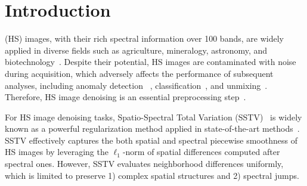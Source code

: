 \section{Introduction}
 (HS) images, with their rich spectral information over 100 bands, are widely applied in diverse fields such as agriculture, mineralogy, astronomy, and biotechnology~\cite{Borengasser2007HSIApplications,Grahn2007Techniques, Thenkabail2016VegetationOverview,Lu2020AgricultureOverview}. Despite their potential, HS images are contaminated with noise during acquisition, which adversely affects the performance of subsequent analyses, including anomaly detection ~\cite{Matteoli2014Anomaly, Su2022Anomaly}, classification~\cite{Ghamisi2017Classification}, and unmixing~\cite{Bioucas-Dias2012UnmixingOverview, Ma2014UnmixingOverview}. Therefore, HS image denoising is an essential preprocessing step~\cite{Shen2015DenoisingOverview, Rasti2018DenoisingOverview, Shen2022DenoisingOverview, Naganuma2022Destriping}.


For HS image denoising tasks, Spatio-Spectral Total Variation (SSTV)~\cite{Aggarwal2016SSTV} is widely known as a powerful regularization method applied in state-of-the-art methods~\cite{Fan2018SSTV-LRTF, Wang2018LRTDTV, Ince2019GLSSTV, Takeyama2020HSSTV, Wang2021l0l1HTV, Takemoto2022GSSTV, Takemoto2023S3TTV, takemoto2024spatiospectral}. SSTV effectively captures the both spatial and spectral piecewise smoothness of HS images by leveraging the $\ell_{1}$-norm of spatial differences computed after spectral ones. However, SSTV evaluates neighborhood differences uniformly, which is limited to preserve 1) complex spatial structures and 2) spectral jumps.



